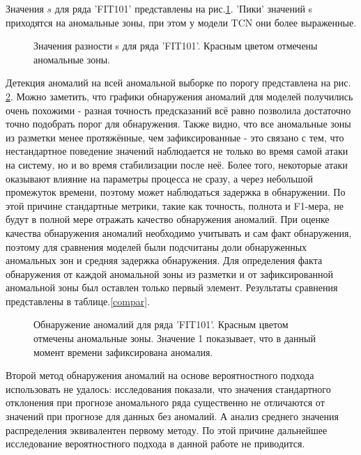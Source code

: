 \documentclass{article}
\begin{document}
Значения $s$ для ряда 'FIT101' представлены на рис.\ref{FIT101_S}. 'Пики' значений s приходятся на аномальные зоны, при этом у модели TCN они более выраженные.

\begin{figure}[H]
\centering
{}%
\hfill
{}%
\caption{Значения разности s для ряда 'FIT101'. Красным цветом отмечены аномальные зоны.}
\label{FIT101_S}
\end{figure}

Детекция аномалий на всей аномальной выборке по порогу представлена на рис. \ref{FIT101_D}. Можно заметить, что графики обнаружения аномалий для моделей получились очень похожими - разная точность предсказаний всё равно позволила достаточно точно подобрать порог для обнаружения. Также видно, что все аномальные зоны из разметки менее протяжённые, чем зафиксированные - это связано с тем, что нестандартное поведение значений наблюдается не только во время самой атаки на систему, но и во время стабилизации после неё. Более того, некоторые атаки оказывают влияние на параметры процесса не сразу, а через небольшой промежуток времени, поэтому может наблюдаться задержка в обнаружении. По этой причине стандартные метрики, такие как точность, полнота и F1-мера, не будут в полной мере отражать качество обнаружения аномалий. При оценке качества обнаружения аномалий необходимо учитывать и сам факт обнаружения, поэтому для сравнения моделей были подсчитаны доли обнаруженных аномальных зон и средняя задержка обнаружения. Для определения факта обнаружения от каждой аномальной зоны из разметки и от зафиксированной аномальной зоны был оставлен только первый элемент. Результаты сравнения представлены в таблице.\ref{compar}. 

\begin{figure}[H]
\centering
{}%
\hfill
{}%
\caption{Обнаружение аномалий для ряда 'FIT101'. Красным цветом отмечены аномальные зоны. Значение 1 показывает, что в данный момент времени зафиксирована аномалия.}
\label{FIT101_D}
\end{figure}

Второй метод обнаружения аномалий на основе вероятностного подхода использовать не удалось: исследования показали, что значения стандартного отклонения при прогнозе аномального ряда существенно не отличаются от значений при прогнозе для данных без аномалий. А анализ среднего значения распределения эквивалентен первому методу. По этой причине дальнейшее исследование вероятностного подхода в данной работе не приводится. 
\end{document}
